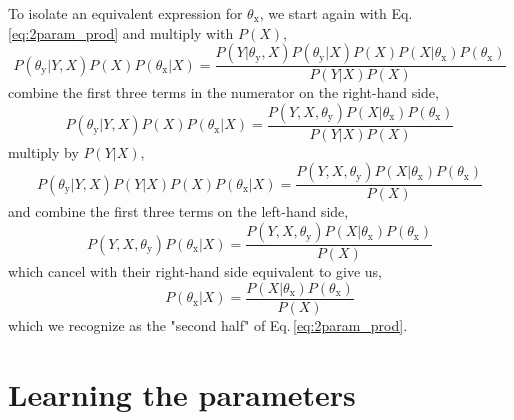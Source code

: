 \documentclass[]{report}
\begin{document}
To isolate an equivalent expression for $\theta_\mathrm{x}$, we start again with Eq.\,\ref{eq:2param_prod} and multiply with $P(X)$,
\begin{equation}
P( \theta_\mathrm{y} | Y, X )
P( X )
P( \theta_\mathrm{x} | X ) 
= 
\frac
	{
		P( Y |\theta_\mathrm{y}, X )
		P( \theta_\mathrm{y} | X )
		P( X )
		P( X | \theta_\mathrm{x} )
		P( \theta_\mathrm{x} )
	}
	{
		P( Y | X )
		P( X )
	}
\end{equation}
combine the first three terms in the numerator on the right-hand side,
\begin{equation}
P( \theta_\mathrm{y} | Y, X )
P( X )
P( \theta_\mathrm{x} | X ) 
=
\frac
	{
		P( Y, X, \theta_\mathrm{y} )
		P( X | \theta_\mathrm{x} )
		P( \theta_\mathrm{x} )
	}
	{
		P( Y | X )
		P( X )
	}
\end{equation}
multiply by $P(Y|X)$,
\begin{equation}
P( \theta_\mathrm{y} | Y, X )
P( Y | X )
P( X )
P( \theta_\mathrm{x} | X ) 
= 
\frac
	{
		P( Y, X, \theta_\mathrm{y} )
		P( X | \theta_\mathrm{x} )
		P( \theta_\mathrm{x} )
	}
	{
		P( X )
	}
\end{equation}
and combine the first three terms on the left-hand side, 
\begin{equation}
P( Y, X, \theta_\mathrm{y} )
P( \theta_\mathrm{x} | X ) 
= 
\frac
	{
		P( Y, X, \theta_\mathrm{y} )
		P( X | \theta_\mathrm{x} )
		P( \theta_\mathrm{x} )
	}
	{
		P( X )
	}
\end{equation}
which cancel with their right-hand side equivalent to give us,
\begin{equation}
P( \theta_\mathrm{x} | X ) 
=
\frac
	{
		P( X | \theta_\mathrm{x} )
		P( \theta_\mathrm{x} )
	}
	{
		P( X )
	}
\end{equation} \label{eq:2param_X}
which we recognize as the "second half" of Eq.\,\ref{eq:2param_prod}.


\section{Learning the parameters}
\end{document}
